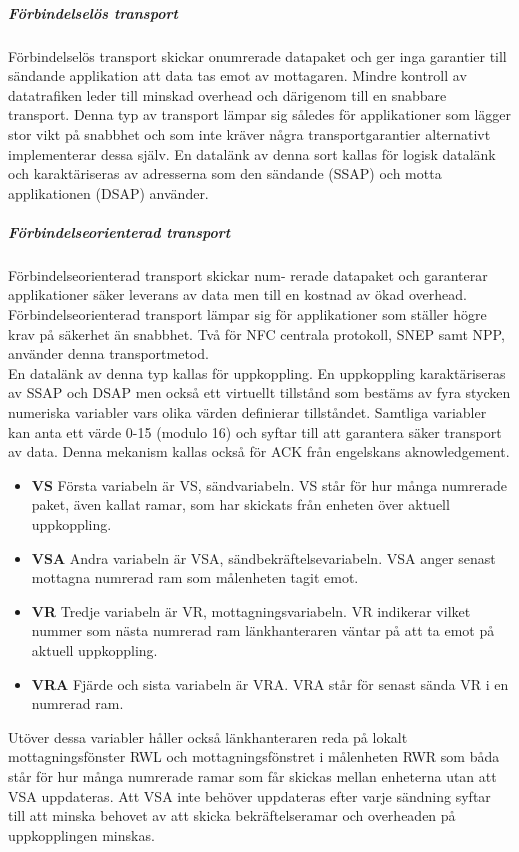 \documentclass[11pt]{article}
\begin{document}
\subparagraph{Förbindelselös transport}
Förbindelselös transport skickar onumrerade datapaket och ger inga garantier till sändande applikation att data tas emot av mottagaren. Mindre kontroll av datatrafiken leder till minskad overhead och därigenom till en snabbare transport. Denna typ av transport lämpar sig således för applikationer som lägger stor vikt på snabbhet och som inte kräver några transportgarantier alternativt implementerar dessa själv. En datalänk av denna sort kallas för logisk datalänk och karaktäriseras av adresserna som den sändande (SSAP) och motta applikationen (DSAP) använder. 

\subparagraph{Förbindelseorienterad transport}
Förbindelseorienterad transport skickar num-
rerade datapaket och garanterar applikationer säker leverans av data men till en kostnad av ökad overhead. Förbindelseorienterad transport lämpar sig för applikationer som ställer högre krav på säkerhet än snabbhet. Två för NFC centrala protokoll, SNEP samt NPP, använder denna transportmetod.\\
En datalänk av denna typ kallas för uppkoppling. En uppkoppling karaktäriseras av SSAP och DSAP men också ett virtuellt tillstånd som bestäms av fyra stycken numeriska variabler vars olika värden definierar tillståndet. Samtliga variabler kan anta ett värde 0-15 (modulo 16) och syftar till att garantera säker transport av data. Denna mekanism kallas också för ACK från engelskans aknowledgement.

\begin{itemize}
\item \textbf{VS} Första variabeln är VS, sändvariabeln.  VS står för hur många numrerade paket, även kallat ramar, som har skickats från enheten över aktuell uppkoppling.
\item \textbf{VSA} Andra variabeln är VSA, sändbekräftelsevariabeln. VSA anger senast mottagna numrerad ram som målenheten tagit emot.
\item \textbf{VR} Tredje variabeln är VR, mottagningsvariabeln. VR indikerar vilket nummer som nästa numrerad ram länkhanteraren väntar på att ta emot på aktuell uppkoppling.
\item \textbf{VRA} Fjärde och sista variabeln är VRA. VRA står för senast sända VR i en numrerad ram.
\end{itemize}

Utöver dessa variabler håller också länkhanteraren reda på lokalt mottagningsfönster RWL och mottagningsfönstret i målenheten RWR som båda står för hur många numrerade ramar som får skickas mellan enheterna utan att VSA uppdateras. Att VSA inte behöver uppdateras efter varje sändning syftar till att minska behovet av att skicka bekräftelseramar och overheaden på uppkopplingen minskas.
\end{document}
